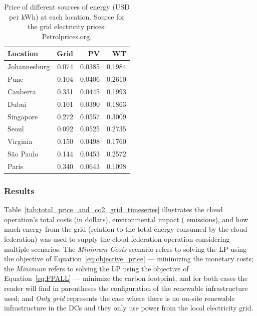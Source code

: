\begin{table}[h]
  
  \caption{Price of different sources of energy (USD per kWh) at each location. Source for the grid electricity prices: Petrolprices.org.  }\label{tab:price_electricity_sources} \centering
  
  \begin{tabular}{|l|r|r|r|}
  \hline    
  \textbf{Location} &   \textbf{Grid} & \textbf{PV} & \textbf{WT} \\
  \hline
  Johannesburg & 0.074 & 0.0385 &  0.1984   \\
  \hline
  Pune      &  0.104   & 0.0406 & 0.2610    \\
  \hline
  Canberra  & 0.331    &  0.0445 & 0.1993   \\
  \hline
  Dubai   & 0.101      & 0.0390 &   0.1863  \\
  \hline
  Singapore & 0.272    & 0.0557 & 0.3009    \\
  \hline     
  Seoul      & 0.092   & 0.0525 & 0.2735    \\
  \hline
  Virginia   & 0.150   &  0.0498 &  0.1760  \\
  \hline
  São Paulo  & 0.144   &  0.0453 & 0.2572   \\
  \hline 
  Paris      & 0.340   &  0.0643 & 0.1098   \\
  \hline  

\end{tabular}
\end{table}

\subsubsection{Results}

Table~\ref{tab:total_price_and_co2_grid_timeseries} illustrates the cloud operation's total costs (in dollars), environmental impact ( emissions), and how much energy from the grid (relation to the total energy consumed by the cloud federation) was used to supply the cloud federation operation considering multiple scenarios. The \textit{Minimum Costs} scenario refers to solving the LP using the objective of Equation~\eqref{eq:objective_price} --- minimizing the monetary costs; the \textit{Minimum } refers to solving the LP using the objective of Equation~\eqref{eq:FPALL} --- minimize the carbon footprint, and for both cases the reader will find in parentheses the configuration of the renewable infrastructure used; and \textit{Only grid} represents the case where there is no on-site renewable infrastructure in the DCs and they only use power from the local electricity grid.


